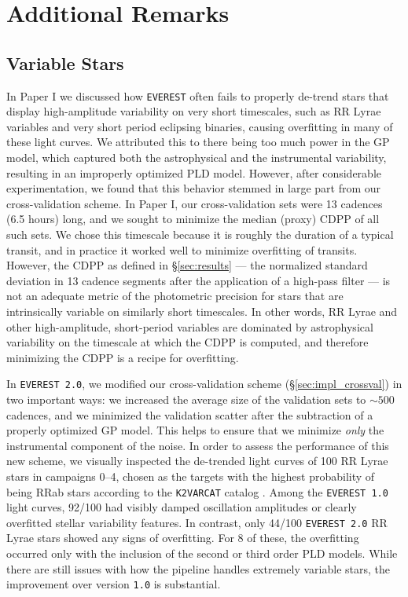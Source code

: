 \documentclass[]{emulateapj}
\newcommand{\edited}[1]{{\color{red} #1}}
\begin{document}
\section{Additional Remarks}
\label{sec:remarks}

\subsection{Variable Stars}
\label{sec:variables}
In Paper I we discussed how \texttt{EVEREST} often fails to properly de-trend stars
that \edited{display high-amplitude variability on very short timescales},
such as RR Lyrae variables and very short period eclipsing
binaries, causing overfitting in many of these light curves. We attributed this to
there being too much power in the GP model, which
captured both the astrophysical and the instrumental variability, resulting in an
improperly optimized PLD model. However, after considerable experimentation, we
found that this behavior stemmed in large part from our cross-validation scheme.
In Paper I, our cross-validation sets were 13 cadences (6.5 hours) long, and we sought to
minimize the median (proxy) CDPP of all such sets. We chose this timescale
because it is roughly the duration of a typical transit, and in practice
it worked well to minimize overfitting of transits. However, the CDPP as defined in
\S\ref{sec:results} --- the normalized standard deviation in 13 cadence segments
after the application of a high-pass filter --- is not an adequate metric of the
photometric precision for stars that are intrinsically variable on similarly short
timescales. In other words, RR Lyrae and other \edited{high-amplitude, short-period} variables
are dominated by astrophysical
variability on the timescale at which the CDPP is computed, and therefore
minimizing the CDPP is a recipe for overfitting.

In \texttt{EVEREST 2.0}, we modified our cross-validation scheme (\S\ref{sec:impl_crossval})
in two important ways: we increased the average size of the validation sets to
${\sim}500$ cadences, and we minimized the validation scatter after the subtraction of
a properly optimized GP model. This helps to ensure that we minimize \emph{only} the instrumental
component of the noise. In order to assess the performance of this new scheme, we
visually inspected the de-trended light curves of 100 RR Lyrae stars in campaigns 0--4,
chosen as the targets with the highest probability of being RRab stars
according to the \texttt{K2VARCAT} catalog \citep{Armstrong16}.
Among the \texttt{EVEREST 1.0} light curves, 92/100 had visibly damped
oscillation amplitudes or clearly overfitted stellar variability features. In contrast,
only 44/100 \texttt{EVEREST 2.0} RR Lyrae stars showed any signs of overfitting. For 8
of these, the overfitting occurred only with the inclusion of the second or third order PLD
models. While there are still issues with how the pipeline handles extremely variable
stars, the improvement over version \texttt{1.0} is substantial.
\end{document}
